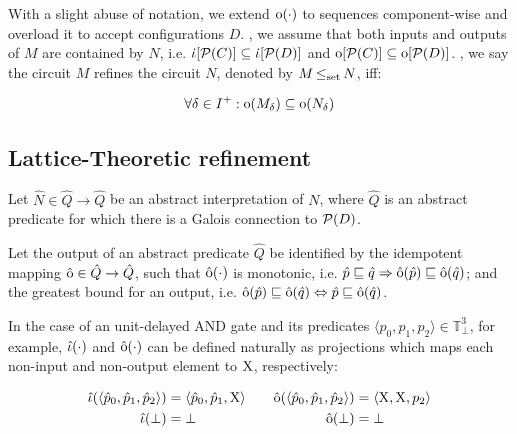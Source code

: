
With a slight abuse of notation, we extend $\operatorname{\mathrm{o}}(\cdot)$ to sequences component-wise and overload it to accept configurations $D$. , we assume that both inputs and outputs of $M$ are contained by $N$, i.e. $\operatorname{\dot{\iota}}[\mathcal{P}(C)] \subseteq \operatorname{\dot{\iota}}[\mathcal{P}(D)]$ and $\operatorname{\mathrm{o}}[\mathcal{P}(C)] \subseteq \operatorname{\mathrm{o}}[\mathcal{P}(D)]$. , we say the circuit $M$ refines the circuit $N$, denoted by $M \operatorname{\leq_{\textrm{set}}} N$, iff:

\begin{equation*}
\forall \delta \in I^{+} : \operatorname{\mathrm{o}}(M_{\delta}) \subseteq \operatorname{\mathrm{o}}(N_{\delta})
\end{equation*}

\subsection{Lattice-Theoretic refinement}

Let $\hat N \in \hat Q \rightarrow \hat Q$ be an abstract interpretation of $N$, where $\hat Q$ is an abstract predicate for which there is a Galois connection to $\mathcal{P}(D)$.

Let the output of an abstract predicate $\hat Q$ be identified by the idempotent mapping $\operatorname{\hat{\mathrm{o}}} \in \hat Q \rightarrow \hat Q$, such that $\operatorname{\hat{\mathrm{o}}}(\cdot)$ is monotonic, i.e. $\hat p \sqsubseteq \hat q \Rightarrow \operatorname{\hat{\mathrm{o}}}(\hat p) \sqsubseteq \operatorname{\hat{\mathrm{o}}}(\hat q)$; and the greatest bound for an output, i.e. $\operatorname{\hat{\mathrm{o}}}(\hat p) \sqsubseteq \operatorname{\hat{\mathrm{o}}}(\hat q) \Leftrightarrow \hat p \sqsubseteq \operatorname{\hat{\mathrm{o}}}(\hat q)$. 



In the case of an unit-delayed AND gate and its predicates $\langle p_{0}, p_{1}, p_{2} \rangle \in \mathbb{T}_{\bot}^{3}$, for example, $\operatorname{\hat{\iota}}(\cdot)$ and $\operatorname{\hat{\mathrm{o}}}(\cdot)$ can be defined naturally as projections which maps each non-input and non-output element to $\mathrm{X}$, respectively:

\begin{equation*}
\begin{aligned}[t]
\operatorname{\hat{\iota}}(\langle \hat p_{0}, \hat p_{1}, \hat p_{2} \rangle) &= \langle \hat p_{0}, \hat p_{1}, \mathrm{X} \rangle \\
\operatorname{\hat{\iota}}(\bot) &= \bot
\end{aligned}
\qquad
\begin{aligned}[t]
\operatorname{\hat{\mathrm{o}}}(\langle \hat p_{0}, \hat p_{1}, \hat p_{2} \rangle) &= \langle \mathrm{X}, \mathrm{X}, p_{2} \rangle \\
\operatorname{\hat{\mathrm{o}}}(\bot) &= \bot
\end{aligned}
\end{equation*}

